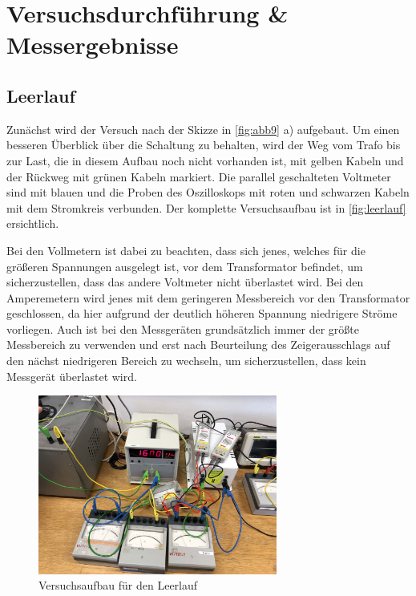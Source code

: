 \documentclass[11pt,ngerman]{scrartcl}
\begin{document}
\newpage

\section{Versuchsdurchführung \& Messergebnisse}\label{sec:Versuchsdurchführung}

\subsection{Leerlauf}

Zunächst wird der Versuch nach der Skizze in
\autoref{fig:abb9} a) aufgebaut. Um einen besseren
Überblick über die Schaltung zu behalten, wird der
Weg vom Trafo bis zur Last, die in diesem Aufbau
noch nicht vorhanden ist, mit gelben Kabeln und der
Rückweg mit grünen Kabeln markiert. Die parallel
geschalteten Voltmeter sind mit blauen und die
Proben des Oszilloskops mit roten und schwarzen
Kabeln mit dem Stromkreis verbunden. Der komplette
Versuchsaufbau ist in \autoref{fig:leerlauf}
ersichtlich.

Bei den Vollmetern ist dabei zu beachten, dass sich jenes, welches für die
größeren Spannungen ausgelegt ist, vor dem Transformator befindet, um
sicherzustellen, dass das andere Voltmeter nicht überlastet wird. Bei den
Amperemetern wird jenes mit dem geringeren Messbereich vor den
Transformator geschlossen, da hier aufgrund der deutlich höheren Spannung
niedrigere Ströme vorliegen. Auch ist bei den Messgeräten grundsätzlich immer
der größte Messbereich zu verwenden und erst nach Beurteilung des
Zeigerausschlags auf den nächst niedrigeren Bereich zu wechseln, um
sicherzustellen, dass kein Messgerät überlastet wird.

\begin{figure}[H]
	\begin{center}
		\includegraphics[width=0.7\textwidth]{leerlauf}
	\end{center}
	\caption{Versuchsaufbau für den Leerlauf}
	\label{fig:leerlauf}
\end{figure}
\end{document}
